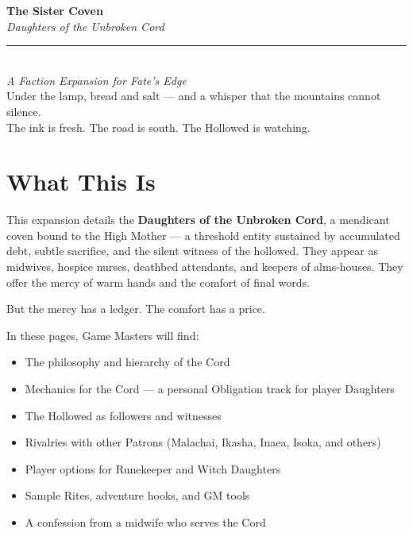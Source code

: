 \documentclass[10pt,twoside]{book}
\begin{document}


\begin{center}
\vspace*{2cm}
{\huge\bfseries\color{threadRed} The Sister Coven}\\[0.8cm]
{\Large\itshape Daughters of the Unbroken Cord}\\[1.5cm]
\rule{0.6\textwidth}{1pt}\\[0.5cm]
\emph{A Faction Expansion for Fate's Edge}\\[1cm]
\vfill
{\small \textcolor{chainGrey}{Under the lamp, bread and salt --- and a whisper that the mountains cannot silence.}}\\[0.2cm]
{\small \textcolor{chainGrey}{The ink is fresh. The road is south. The Hollowed is watching.}}
\end{center}
\newpage

\chapter*{What This Is}

This expansion details the \textbf{Daughters of the Unbroken Cord}, a mendicant coven bound to the High Mother --- a threshold entity sustained by accumulated debt, subtle sacrifice, and the silent witness of the hollowed. They appear as midwives, hospice nurses, deathbed attendants, and keepers of alms-houses. They offer the mercy of warm hands and the comfort of final words.

But the mercy has a ledger. The comfort has a price.

In these pages, Game Masters will find:
\begin{itemize}
\item The philosophy and hierarchy of the Cord
\item Mechanics for the Cord --- a personal Obligation track for player Daughters
\item The Hollowed as followers and witnesses
\item Rivalries with other Patrons (Malachai, Ikasha, Inaea, Isoka, and others)
\item Player options for Runekeeper and Witch Daughters
\item Sample Rites, adventure hooks, and GM tools
\item A confession from a midwife who serves the Cord
\end{itemize}
\end{document}
